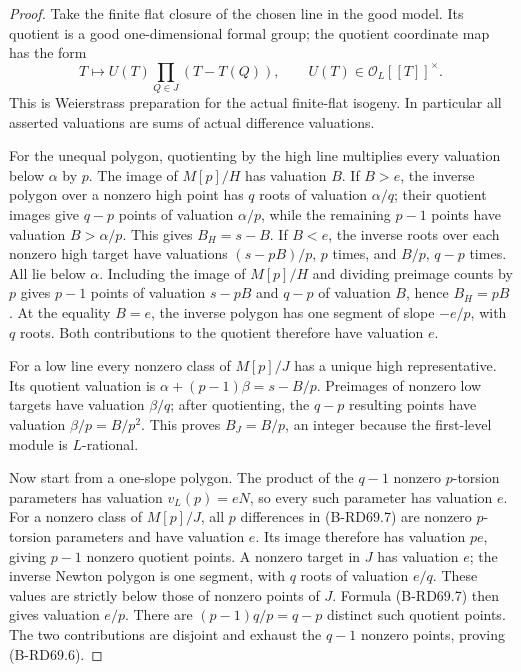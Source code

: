 \begin{proof}
Take the finite flat closure of the chosen line in the good
model. Its quotient is a good one-dimensional formal group;
the quotient coordinate map has the form
\[
 T\longmapsto U(T)\prod_{Q\in J}(T-T(Q)),\qquad U(T)\in
 \mathcal O_L[[T]]^\times .
 \tag{B-RD69.7}
\]
This is Weierstrass preparation for the actual finite-flat
isogeny. In particular all asserted valuations are sums of
actual difference valuations.

For the unequal polygon, quotienting by the high line multiplies
every valuation below \(\alpha\) by \(p\).
The image of \(M[p]/H\) has valuation \(B\).
If \(B>e\), the inverse polygon over a nonzero high point has
\(q\) roots of valuation \(\alpha/q\); their quotient images
give \(q-p\) points of valuation \(\alpha/p\), while the
remaining \(p-1\) points have valuation \(B>\alpha/p\).
This gives \(B_H=s-B\).
If \(B<e\), the inverse roots over each nonzero high target
have valuations \((s-pB)/p\), \(p\) times, and \(B/p\),
\(q-p\) times. All lie below \(\alpha\). Including the image
of \(M[p]/H\) and dividing preimage counts by \(p\) gives
\(p-1\) points of valuation \(s-pB\) and \(q-p\) of valuation
\(B\), hence \(B_H=pB\).
At the equality \(B=e\), the inverse polygon has one segment
of slope \(-e/p\), with \(q\) roots. Both contributions to
the quotient therefore have valuation \(e\).

For a low line every nonzero class of \(M[p]/J\) has a unique
high representative. Its quotient valuation is
\(\alpha+(p-1)\beta=s-B/p\).
Preimages of nonzero low targets have valuation \(\beta/q\);
after quotienting, the \(q-p\) resulting points have valuation
\(\beta/p=B/p^2\). This proves \(B_J=B/p\), an integer because
the first-level module is \(L\)-rational.

Now start from a one-slope polygon. The product of the \(q-1\)
nonzero \(p\)-torsion parameters has valuation \(v_L(p)=eN\),
so every such parameter has valuation \(e\). For a nonzero
class of \(M[p]/J\), all \(p\) differences in (B-RD69.7) are
nonzero \(p\)-torsion parameters and have valuation \(e\).
Its image therefore has valuation \(pe\), giving \(p-1\)
nonzero quotient points. A nonzero target in \(J\) has valuation
\(e\); the inverse Newton polygon is one segment, with \(q\)
roots of valuation \(e/q\). These values are strictly below
those of nonzero points of \(J\). Formula (B-RD69.7) then gives
valuation \(e/p\). There are \((p-1)q/p=q-p\) distinct such
quotient points. The two contributions are disjoint and exhaust
the \(q-1\) nonzero points, proving (B-RD69.6).


\end{proof}
